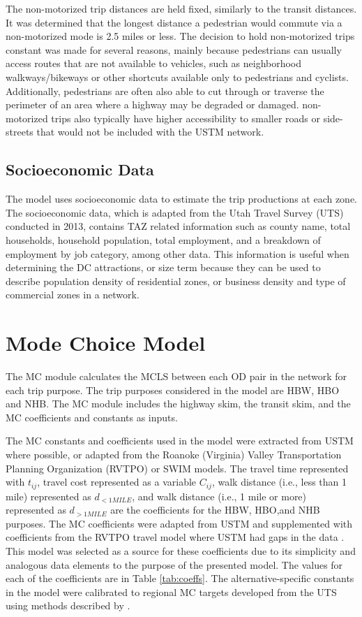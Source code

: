 The non-motorized trip distances are held fixed, similarly to the transit distances. It was
determined that the longest distance a pedestrian would commute via a non-motorized
mode is 2.5 miles or less. The decision to hold non-motorized
trips constant was made for several reasons, mainly because pedestrians can usually
access routes that are not available to vehicles, such as neighborhood walkways/bikeways
or other shortcuts available only to pedestrians and cyclists. Additionally,
pedestrians are often also able to cut through or traverse the perimeter of an
area where a highway may be degraded or damaged. non-motorized trips also typically have
higher accessibility to smaller roads or side-streets that would not be included
with the USTM network.

\subsection{Socioeconomic Data}

The model uses socioeconomic data to estimate the trip productions at
each zone. The socioeconomic data, which is adapted from the Utah Travel Survey (UTS) conducted in 2013, contains TAZ related information such
as county name, total households, household population, total employment,
and a breakdown of employment by job category, among other data. This information is useful
when determining the DC attractions, or size term because they can be used to
describe population density of residential zones, or business density and type
of commercial zones in a network.

\section{Mode Choice Model}

The MC module calculates the MCLS between each OD pair in the
network for each trip purpose. The trip purposes considered in the model are HBW, HBO and NHB. The MC module includes the highway skim,
the transit skim, and the MC coefficients and constants as inputs.

The MC constants and coefficients used in the model were extracted
from USTM where possible, or adapted from the Roanoke (Virginia)
Valley Transportation Planning Organization (RVTPO) or SWIM models. The travel time represented with $t_{ij}$, travel cost
represented as a variable $C_{ij}$, walk distance (i.e., less than 1 mile) represented
as $d_{<1MILE}$, and walk distance (i.e., 1 mile or more) represented as $d_{>1MILE}$
are the coefficients for the
HBW, HBO,and NHB purposes. The MC coefficients were adapted
from USTM and supplemented with coefficients from the RVTPO travel model where USTM had gaps in the data \citep{rvtpoversion, swimversion}. This model was
selected as a source for these coefficients due to its simplicity and analogous data elements to the purpose of the presented model. The
values for each of the coefficients are in Table \ref{tab:coeffs}. The alternative-specific constants in the model were calibrated to regional MC
targets developed from the UTS using
methods described by \citet{koppelman2006}.


